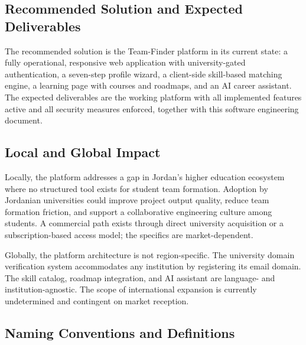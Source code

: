 \documentclass[12pt,a4paper]{article}
\begin{document}
\subsection{Recommended Solution and Expected Deliverables}

The recommended solution is the Team-Finder platform in its current state: a fully
operational, responsive web application with university-gated authentication, a seven-step
profile wizard, a client-side skill-based matching engine, a learning page with courses
and roadmaps, and an AI career assistant. The expected deliverables are the working
platform with all implemented features active and all security measures enforced, together
with this software engineering document.

\subsection{Local and Global Impact}

Locally, the platform addresses a gap in Jordan's higher education ecosystem where no
structured tool exists for student team formation. Adoption by Jordanian universities
could improve project output quality, reduce team formation friction, and support a
collaborative engineering culture among students. A commercial path exists through direct
university acquisition or a subscription-based access model; the specifics are
market-dependent.

Globally, the platform architecture is not region-specific. The university domain
verification system accommodates any institution by registering its email domain. The
skill catalog, roadmap integration, and AI assistant are language- and institution-agnostic.
The scope of international expansion is currently undetermined and contingent on market
reception.

\subsection{Naming Conventions and Definitions}
\end{document}
